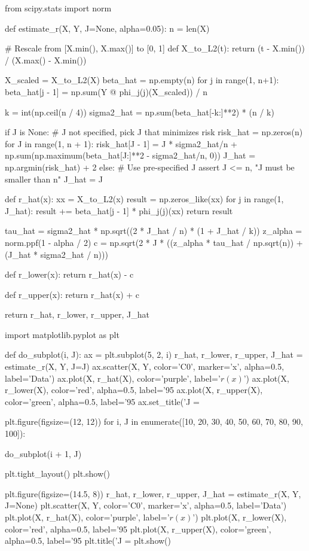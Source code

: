 \begin{python}
from scipy.stats import norm

def estimate_r(X, Y, J=None, alpha=0.05):
    n = len(X)

    # Rescale from [X.min(), X.max()] to [0, 1]
    def X_to_L2(t):
        return (t - X.min()) / (X.max() - X.min())
    
    X_scaled = X_to_L2(X)
    beta_hat = np.empty(n)
    for j in range(1, n+1):
        beta_hat[j - 1] = np.sum(Y @ phi_j(j)(X_scaled)) / n
        
    k = int(np.ceil(n / 4))
    sigma2_hat = np.sum(beta_hat[-k:]**2) * (n / k)

    if J is None:
        # J not specified, pick J that minimizes risk
        risk_hat = np.zeros(n)
        for J in range(1, n + 1):
            risk_hat[J - 1] = J * sigma2_hat/n + np.sum(np.maximum(beta_hat[J:]**2 - sigma2_hat/n, 0))
        J_hat = np.argmin(risk_hat) + 2
    else:
        # Use pre-specified J
        assert J <= n, "J must be smaller than n"
        J_hat = J

    def r_hat(x):
        xx = X_to_L2(x)
        result = np.zeros_like(xx)
        for j in range(1, J_hat):
            result += beta_hat[j - 1] * phi_j(j)(xx)
        return result
        
    tau_hat = sigma2_hat * np.sqrt((2 * J_hat / n) * (1 + J_hat / k))
    z_alpha = norm.ppf(1 - alpha / 2)
    c = np.sqrt(2 * J * ((z_alpha * tau_hat / np.sqrt(n)) + (J_hat * sigma2_hat / n)))
    
    def r_lower(x):
        return r_hat(x) - c
    
    def r_upper(x):
        return r_hat(x) + c
            
    return r_hat, r_lower, r_upper, J_hat
\end{python}

\begin{python}
import matplotlib.pyplot as plt

def do_subplot(i, J):
    ax = plt.subplot(5, 2, i)
    r_hat, r_lower, r_upper, J_hat = estimate_r(X, Y, J=J)
    ax.scatter(X, Y, color='C0', marker='x', alpha=0.5, label='Data')
    ax.plot(X, r_hat(X), color='purple', label='$r(x)$')
    ax.plot(X, r_lower(X), color='red', alpha=0.5, label='95%
    ax.plot(X, r_upper(X), color='green', alpha=0.5, label='95%
    ax.set_title('J = %
    
plt.figure(figsize=(12, 12))
for i, J in enumerate([10, 20, 30, 40, 50, 60, 70, 80, 90, 100]):
    
    do_subplot(i + 1, J)

plt.tight_layout()
plt.show()

plt.figure(figsize=(14.5, 8))
r_hat, r_lower, r_upper, J_hat = estimate_r(X, Y, J=None)
plt.scatter(X, Y, color='C0', marker='x', alpha=0.5, label='Data')
plt.plot(X, r_hat(X), color='purple', label='$r(x)$')
plt.plot(X, r_lower(X), color='red', alpha=0.5, label='95%
plt.plot(X, r_upper(X), color='green', alpha=0.5, label='95%
plt.title('J = %
plt.show()
\end{python}

